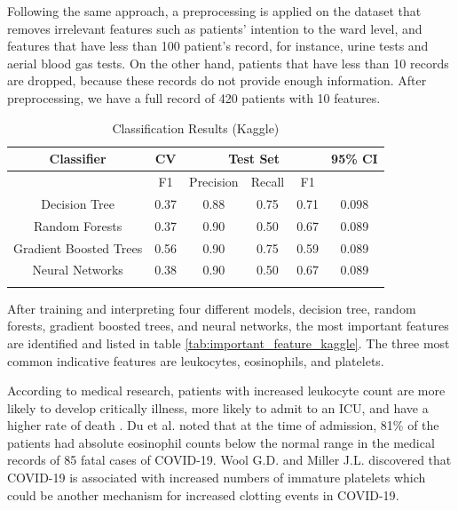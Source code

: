 Following the same approach, a preprocessing is applied on the dataset that removes irrelevant features such as patients' intention to the ward level, and features that have less than 100 patient's record, for instance, urine tests and aerial blood gas tests. On the other hand, patients that have less than 10 records are dropped, because these records do not provide enough information. After preprocessing, we have a full record of 420 patients with 10 features.
\color{black}

\begin{table}[H]
\centering
\begin{tabular}{cccccc}
\toprule
Classifier    & CV & \multicolumn{3}{c}{Test Set} & 95\% CI \\ \midrule
              & F1               & Precision  & Recall  & F1    &\\
Decision Tree & 0.37             & 0.88       & 0.75    & 0.71  & 0.098\\
Random Forests & 0.37             & 0.90       & 0.50    & 0.67  & 0.089\\
Gradient Boosted Trees  & 0.56    & 0.90       & 0.75    & 0.59 & 0.089\\
Neural Networks       & 0.38             & 0.90       & 0.50    & 0.67 & 0.089\\ \bottomrule
\label{tab:kaggle_models}
\end{tabular}
\caption{Classification Results (Kaggle)}
\end{table}

After training and interpreting four different models, decision tree, random forests, gradient boosted trees, and neural networks, the most important features are identified and listed in table \ref{tab:important_feature_kaggle}. The three most common indicative features are leukocytes, eosinophils, and platelets.

According to medical research, patients with increased leukocyte count are more likely to develop critically illness, more likely to admit to an ICU, and have a higher rate of death \citep{zhao2020clinical}. Du et al. noted that at the time of admission, 81\% of the patients had absolute eosinophil counts below the normal range in the medical records of 85 fatal cases of COVID-19\citep{du2020clinical}. Wool G.D. and Miller J.L. discovered that COVID-19 is associated with increased numbers of immature platelets which could be another mechanism for increased clotting events in COVID-19\citep{wool2021impact}.

